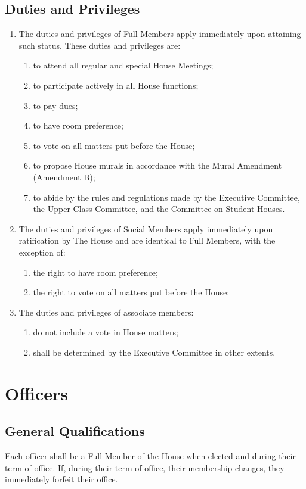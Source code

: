 \documentclass[10pt]{article} %
\begin{document}
\subsection{Duties and Privileges}
\begin{enumerate}
\item The duties and privileges of Full Members apply immediately upon attaining such status. These duties and privileges are:
\begin{enumerate}
\item to attend all regular and special House Meetings;
\item to participate actively in all House functions;
\item to pay dues;
\item to have room preference;
\item to vote on all matters put before the House;
\item to propose House murals in accordance with the Mural Amendment (Amendment B);
\item to abide by the rules and regulations made by the Executive Committee, the Upper Class Committee, and the Committee on Student Houses.
\end{enumerate}
\item The duties and privileges of Social Members apply immediately upon ratification by The House and are identical to Full Members, with the exception of:
\begin{enumerate}
\item the right to have room preference;
\item the right to vote on all matters put before the House;
\end{enumerate}
\item The duties and privileges of associate members:
\begin{enumerate}
\item do not include a vote in House matters;
\item shall be determined by the Executive Committee in other extents.
\end{enumerate}
\end{enumerate}
\section{Officers}
\subsection{General Qualifications}
Each officer shall be a Full Member of the House when elected and during their term of office. If, during their term of office, their membership changes, they immediately forfeit their office.
\end{document}
